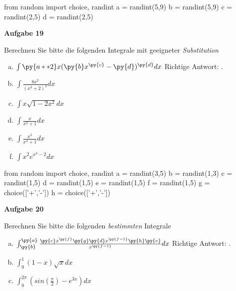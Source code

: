 \documentclass[a4paper,12pt]{article}
\newcommand{\Aufgabe}[1]{
	{
		\vspace*{0.5cm}
		\textsf{\textbf{Aufgabe #1}}
		\vspace*{0.2cm}
		
	}
}
\begin{document}
\begin{pycode}
from random import choice, randint
a = randint(5,9)
b = randint(5,9)
c = randint(2,5)
d = randint(2,5)
\end{pycode}

\Aufgabe{19}
Berechnen Sie bitte die folgenden Integrale mit geeigneter \textit{Substitution}
\begin{multicols}{2}
	\begin{enumerate}[a)]
		\item $\int  \py{a**2}x (\py{b}x^{\py{c}}-\py{d})^{\py{d}}  dx$
		\ifnum{} 
		\newline Richtige Antwort: .
		\fi 
		\item $\int  \frac{8x^2}{(x^3+2)^3} dx$
		\item $\int  x\sqrt{1-2x^2} dx$
		\item $\int  \frac{x}{x^2+1} dx$
		\item $\int  \frac{x^3}{x^4+1} dx$
		\item $\int x^2  e^{x^3-2} dx$
	\end{enumerate}
\end{multicols}

\begin{pycode}
from random import choice, randint
a = randint(3,5)
b = randint(1,3)
c = randint(1,5)
d = randint(1,5)
e = randint(1,5)
f = randint(1,5)
g = choice(['+','-'])
h = choice(['+','-'])
\end{pycode}

\Aufgabe{20}
Berechnen Sie bitte die folgenden \textit{bestimmten} Integrale
\begin{multicols}{2}
	\begin{enumerate}[a)]
		\item $\int^{\py{a}}_{\py{b}}  \frac{\py{c}x^{\py{f}} \py{g} \py{d}x^{\py{f-1}} \py{h} \py{e}}{x^{\py{f-1}}}  dx$
		\ifnum{} 
		\newline Richtige Antwort: .
		\fi
		\item $\int^{1}_{0}  (1-x)\sqrt{x} dx$
		\item $\int^{2\pi}_{0} (sin(\frac{\pi}{2})-e^{3x}) dx$
	\end{enumerate}
\end{multicols}
\end{document}
